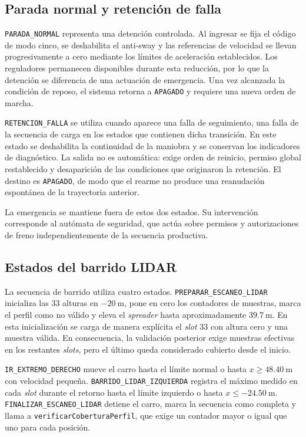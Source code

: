 \documentclass[a4paper,10pt,onecolumn,journal]{ieeeconf}
\numberwithin{equation}{section}
\begin{document}

\subsection{Parada normal y retención de falla}
\texttt{PARADA\_NORMAL} representa una detención controlada. Al ingresar se fija el código de modo cinco, se deshabilita el anti-sway y las referencias de velocidad se llevan progresivamente a cero mediante los límites de aceleración establecidos. Los reguladores permanecen disponibles durante esta reducción, por lo que la detención se diferencia de una actuación de emergencia. Una vez alcanzada la condición de reposo, el sistema retorna a \texttt{APAGADO} y requiere una nueva orden de marcha.

\texttt{RETENCION\_FALLA} se utiliza cuando aparece una falla de seguimiento, una falla de la secuencia de carga en los estados que contienen dicha transición. En este estado se deshabilita la continuidad de la maniobra y se conservan los indicadores de diagnóstico. La salida no es automática: exige orden de reinicio, permiso global restablecido y desaparición de las condiciones que originaron la retención. El destino es \texttt{APAGADO}, de modo que el rearme no produce una reanudación espontánea de la trayectoria anterior.

La emergencia se mantiene fuera de estos dos estados. Su intervención corresponde al autómata de seguridad, que actúa sobre permisos y autorizaciones de freno independientemente de la secuencia productiva.


\subsection{Estados del barrido LIDAR}
La secuencia de barrido utiliza cuatro estados. \texttt{PREPARAR\_ESCANEO\_LIDAR} inicializa las 33 alturas en $-20~\mathrm{m}$, pone en cero los contadores de muestras, marca el perfil como no válido y eleva el \textit{spreader} hasta aproximadamente $39.7~\mathrm{m}$. En esta inicialización se carga de manera explícita el \textit{slot} 33 con altura cero y una muestra válida. En consecuencia, la validación posterior exige muestras efectivas en los restantes \textit{slots}, pero el último queda considerado cubierto desde el inicio.

\texttt{IR\_EXTREMO\_DERECHO} mueve el carro hasta el límite normal o hasta $x\geq48.40~\mathrm{m}$ con velocidad pequeña. \texttt{BARRIDO\_LIDAR\_IZQUIERDA} registra el máximo medido en cada \textit{slot} durante el retorno hasta el límite izquierdo o hasta $x\leq-24.50~\mathrm{m}$. \texttt{FINALIZAR\_ESCANEO\_LIDAR} detiene el carro, marca la secuencia como completa y llama a \texttt{verificarCoberturaPerfil}, que exige un contador mayor o igual que uno para cada posición.
\end{document}
